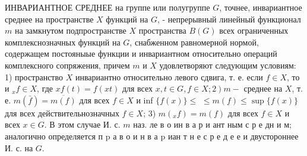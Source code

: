 \documentclass[10pt]{article}
\begin{document}
ИНВАРИАНТНОЕ СРЕДНЕЕ на группе или полугруппе $G$, точнее, инвариантное среднее на пространстве $X$ функций на $G$, - непрерывный линейный функционал $m$ на замкнутом подпространстве $X$ пространства $B(G)$ всех ограниченных комплекснозначных функций на $G$, снабженном равномерной нормой, содержащем постояныые функции и инвариантном относительно операций комплексного сопряжения, причем $m$ и $X$ удовлетворяют следующим условиям: 1) пространство $X$ инвариантно относительно левого сдвига, т. е. если $f \in X$, то и ${ }_{x} f \in X$, где $x f(t)=f(x t)$ для всех $\left.x, t \in G, f \in X ; 2\right) m-$ среднее на $X$, т. е. $m(\bar{f})=\overline{m(f)}$ для всех $f \in X$ и inf $\{f(x)\} \leqslant$ $\leqslant m(f) \leqslant \sup \{f(x)\}$ для всех действительнозначных $f \in X$; 3) $m\left({ }_{x} f\right)=m(f)$ для всех $f \in X$ и всех $x \in G$. В этом случае И. с. $m$ наз. ле в о ин в а р и ант ным с р е дн и м; аналогично определяется п $\mathrm{p}$ а в о и н в а $\mathrm{p}$ иан т н е с р е д е е и двустороннее И. с. на $G$.
\end{document}
